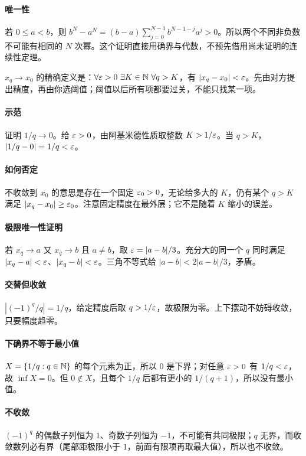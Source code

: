 \paragraph{唯一性}若 $0\le a<b$，则 $b^N-a^N=(b-a)\sum_{j=0}^{N-1}b^{N-1-j}a^j>0$。所以两个不同非负数不可能有相同的 $N$ 次幂。这个证明直接用确界与代数，不预先借用尚未证明的连续性定理。

$x_q\to x_0$ 的精确定义是：$\forall\varepsilon>0\ \exists K\in\mathbb{N}\ \forall q>K$，有 $|x_q-x_0|<\varepsilon$。先由对方提出精度，再由你选阈值；阈值以后所有项都要过关，不能只找某一项。
\paragraph{示范}证明 $1/q\to0$。给 $\varepsilon>0$，由阿基米德性质取整数 $K>1/\varepsilon$。当 $q>K$，$|1/q-0|=1/q<\varepsilon$。
\paragraph{如何否定}不收敛到 $x_0$ 的意思是存在一个固定 $\varepsilon_0>0$，无论给多大的 $K$，仍有某个 $q>K$ 满足 $|x_q-x_0|\ge\varepsilon_0$。注意固定精度在最外层；它不是随着 $K$ 缩小的误差。

\paragraph{极限唯一性证明}若 $x_q\to a$ 又 $x_q\to b$ 且 $a\ne b$，取 $\varepsilon=|a-b|/3$。充分大的同一个 $q$ 同时满足 $|x_q-a|<\varepsilon$、$|x_q-b|<\varepsilon$。三角不等式给 $|a-b|<2|a-b|/3$，矛盾。
\paragraph{交替但收敛}$|(-1)^q/q|=1/q$，给定精度后取 $q>1/\varepsilon$，故极限为零。上下摆动不妨碍收敛，只要幅度趋零。
\paragraph{下确界不等于最小值}$X=\{1/q:q\in\mathbb{N}\}$ 的每个元素为正，所以 $0$ 是下界；对任意 $\varepsilon>0$ 有 $1/q<\varepsilon$，故 $\inf X=0$。但 $0\notin X$，且每个 $1/q$ 后都有更小的 $1/(q+1)$，所以没有最小值。
\paragraph{不收敛}$(-1)^q$ 的偶数子列恒为 $1$、奇数子列恒为 $-1$，不可能有共同极限；$q$ 无界，而收敛数列必有界（尾部距极限小于 $1$，前面有限项再取最大值），所以也不收敛。

